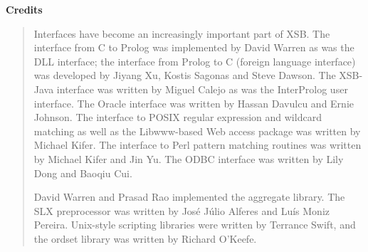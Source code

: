 
\begin{center}
{\bf {\Large 
		Credits
}}
\end{center}


\begin{quote}
  Interfaces have become an increasingly important part of XSB.  The
  interface from C to Prolog was implemented by David Warren as was the DLL
  interface; the interface from Prolog to C (foreign language interface)
  was developed by Jiyang Xu, Kostis Sagonas and Steve Dawson.  The
  XSB-Java interface was written by Miguel Calejo as was the InterProlog
  user interface.  The Oracle interface was written by Hassan Davulcu and
  Ernie Johnson. The interface to POSIX regular expression and
  wildcard matching as well as the Libwww-based Web access package was
  written by Michael Kifer.  The interface 
  to Perl pattern matching routines was written by Michael Kifer and Jin
  Yu.  The ODBC interface was written by Lily Dong and Baoqiu Cui.
  
  David Warren and Prasad Rao implemented the aggregate library.  The SLX
  preprocessor was written by Jos\'e J\'ulio Alferes and Lu\'is Moniz
  Pereira.  Unix-style scripting libraries were written by Terrance Swift,
  and the ordset library was written by Richard O'Keefe.
\end{quote}

